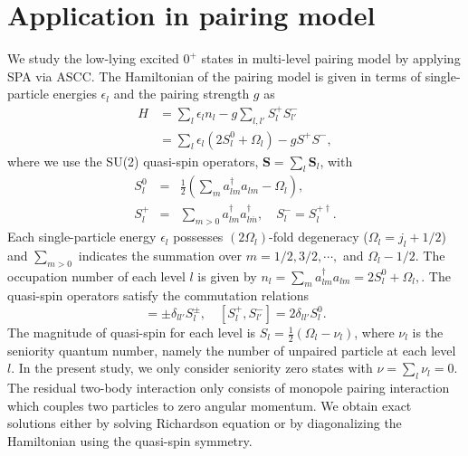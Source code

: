 \documentclass[%
superscriptaddress,
showpacs,
nofootinbib,
amsmath,amssymb,
aps,
prc,
twocolumn,
floatfix ]%
{revtex4-1}
\begin{document}
\section{Application in pairing model}
We study the low-lying excited $0^+$ states in multi-level pairing model by applying SPA via ASCC. 
The Hamiltonian of the pairing model is given in terms of
single-particle energies $\epsilon_l$ and the pairing strength $g$ as
\begin{align}
	H &= \sum_l \epsilon_l n_l - g \sum_{l,l'} S_l^+ S_{l'}^- \nonumber \\
    &= \sum_l\epsilon_l(2S_l^0+\Omega_l) - g S^+ S^{-} ,
\end{align}
where we use the SU(2) quasi-spin operators,
$\boldsymbol{S}=\sum_l \boldsymbol{S}_l$, with
\begin{eqnarray}
        S_l^0 &=& \frac{1}{2}(\sum_ma_{lm}^{\dag}a_{lm}-\Omega_l) ,\\
        S_l^{+} &=& \sum_{m>0}a_{lm}^{\dag}a_{l\overline{m}}^{\dag} ,
\quad   S_l^{-} = S_l^{+\dag} .
\end{eqnarray}
Each single-particle energy $\epsilon_l$ possesses $(2\Omega_l)$-fold
degeneracy ($\Omega_l=j_l+1/2$)
and $\sum_{m>0}$ indicates the summation over $m=1/2,3/2,\cdots,$ and $\Omega_l-1/2$.
The occupation number of each level $l$ is given by
$
	n_l = \sum_m a^{\dag}_{lm}a_{lm} = 2S_l^0+\Omega_l ,
$.
The quasi-spin operators satisfy the commutation relations
\begin{equation}
  [S_l^0,S_{l'}^{\pm}] = \pm\delta_{ll'}S_{l}^{\pm},
	\quad [S_{l}^{+},S_{l'}^{-}] = 2\delta_{ll'}S_{l}^{0} .
\end{equation}
The magnitude of quasi-spin for each level is
$S_l=\frac{1}{2}(\Omega_l-\nu_l)$, where $\nu_l$ is the seniority
quantum number, namely the number of unpaired particle at each level $l$.
In the present study, we only consider seniority zero states with
$\nu=\sum_l \nu_l=0$.
The residual two-body interaction only consists of monopole pairing
interaction which couples two particles to zero angular momentum.
We obtain exact solutions either by solving Richardson equation
\cite{Richardson,Richardson2,Richardson3} or
by diagonalizing the Hamiltonian using the quasi-spin symmetry.
\end{document}
